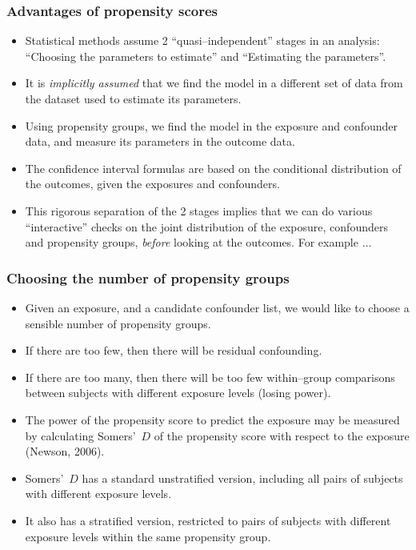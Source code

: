 \documentclass[11pt]{beamer}
\begin{document}
\begin{frame}
\frametitle{Advantages of propensity scores}

\begin{itemize}

\item<2-> Statistical methods assume 2 ``quasi--independent'' stages in an analysis:
``Choosing the parameters to estimate'' and ``Estimating the parameters''.

\item<3-> It is \textit{implicitly assumed} that we find the model in a different set of data
from the dataset used to estimate its parameters.

\item<4-> Using propensity groups, we find the model in the exposure and confounder data,
and measure its parameters in the outcome data.

\item<5-> The confidence interval formulas are based on the conditional distribution of the outcomes,
given the exposures and confounders.

\item<6-> This rigorous separation of the 2 stages implies that we can do various ``interactive'' checks
on the joint distribution of the exposure, confounders and propensity groups,
\textit{before} looking at the outcomes. For example $\ldots$

\end{itemize}

\end{frame}

\begin{frame}
\frametitle{Choosing the number of propensity groups}

\begin{itemize}

\item<2-> Given an exposure, and a candidate confounder list,
we would like to choose a sensible number of propensity groups.

\item<3-> If there are too few, then there will be residual confounding.

\item<4-> If there are too many, then there will be too few within--group comparisons
between subjects with different exposure levels (losing power).

\item<5-> The power of the propensity score to predict the exposure may be measured by calculating
Somers'~$D$ of the propensity score with respect to the exposure (Newson, 2006\cite{newson2006}).

\item<6-> Somers'~$D$ has a standard unstratified version,
including all pairs of subjects with different exposure levels.

\item<7-> It also has a stratified version,
restricted to pairs of subjects with different exposure levels within the same propensity group.

\end{itemize}

\end{frame}
\end{document}
